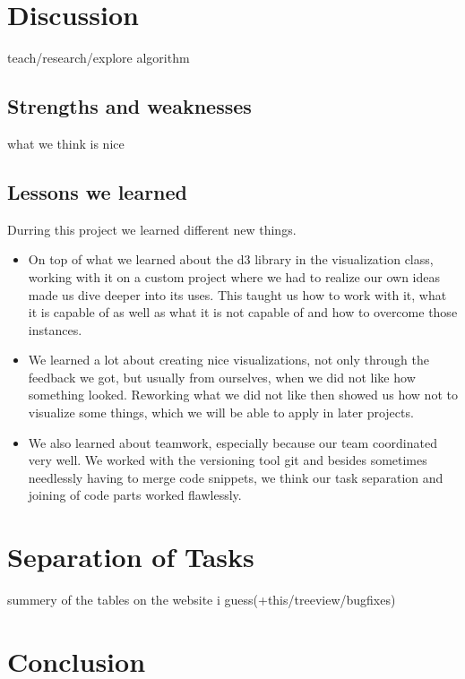 \documentclass{vgtc}                          %
\begin{document}
\section{Discussion}

teach/research/explore algorithm

\subsection{Strengths and weaknesses}
what we think is nice
\subsection{Lessons we learned}
\begin{flushleft}
Durring this project we learned different new things.
\end{flushleft}
\begin{itemize}
\item On top of what we learned about the d3 library in the visualization class, working with it on a custom project where we had to realize our own ideas made us dive deeper into its uses. This taught us how to work with it, what it is capable of as well as what it is not capable of and how to overcome those instances. 
\item We learned a lot about creating nice visualizations, not only through the feedback we got, but usually from ourselves, when we did not like how something looked. Reworking what we did not like then showed us how not to visualize some things, which we will be able to apply in later projects.
\item We also learned about teamwork, especially because our team coordinated very well. We worked with the versioning tool git and besides sometimes needlessly having to merge code snippets, we think our task separation and joining of code parts worked flawlessly.
\end{itemize}

\section{Separation of Tasks}

summery of the tables on the website i guess(+this/treeview/bugfixes)

\section{Conclusion}
\end{document}
